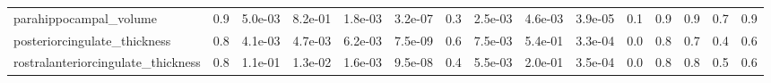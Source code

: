 \begin{tabular}{lrrrrrrrrrrrrrr}
parahippocampal\_volume             &  0.9 &     5.0e-03 &      8.2e-01 &  1.8e-03 &      3.2e-07 &           0.3 &       2.5e-03 &  4.6e-03 &  3.9e-05 &  0.1 &  0.9 &     0.9 &  0.7 &     0.9 \\
posteriorcingulate\_thickness       &  0.8 &     4.1e-03 &      4.7e-03 &  6.2e-03 &      7.5e-09 &           0.6 &       7.5e-03 &  5.4e-01 &  3.3e-04 &  0.0 &  0.8 &     0.7 &  0.4 &     0.6 \\
rostralanteriorcingulate\_thickness &  0.8 &     1.1e-01 &      1.3e-02 &  1.6e-03 &      9.5e-08 &           0.4 &       5.5e-03 &  2.0e-01 &  3.5e-04 &  0.0 &  0.8 &     0.8 &  0.5 &     0.6 \\
\bottomrule
\end{tabular}

